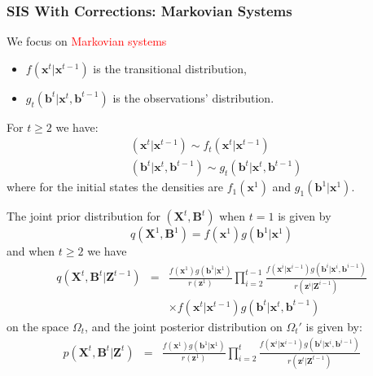 \documentclass[9pt, xcolor={dvipsnames,svgnames,table}]{beamer}
\begin{document}
\begin{frame}
    \frametitle{SIS With Corrections: Markovian Systems}
    We focus on \textcolor{Red}{Markovian systems}
    \begin{itemize}
        \item $f(\bm{x}^t | \bm{x}^{t-1})$ is the transitional distribution,
        \item  $g_t(\bm{b}^t | \bm{x}^t, \bm{b}^{t-1})$ is the observations' distribution.
    \end{itemize}
    For $t \geq 2$ we have:
    \begin{align*}
        &(\bm{x}^t | \bm{x}^{t-1}) \sim f_t(\bm{x}^t | \bm{x}^{t-1})\\
        &(\bm{b}^t | \bm{x}^t, \bm{b}^{t-1}) \sim g_t(\bm{b}^t | \bm{x}^t, \bm{b}^{t-1})
    \end{align*}
    where for the initial states the densities are $f_1(\bm{x}^1)$ and $g_1(\bm{b}^1 | \bm{x}^1)$.
    
    \textcolor{PineGreen}{The joint prior distribution} for $(\bm{X}^t,\bm{B}^t)$ when $t=1$ is given by 
    \begin{equation*}
    q(\bm{X}^1,\bm{B}^1) = f(\bm{x}^1)g(\bm{b}^1 | \bm{x}^1)
    \end{equation*}
    and when $t \geq 2$ we have
    \begin{eqnarray*}
        q(\bm{X}^t, \bm{B}^t | \bm{Z}^{t-1}) &=& \frac{f(\bm{x}^1)g(\bm{b}^1 | \bm{x}^1)}{r(\bm{z}^1)} \prod_{i=2}^{t-1} \frac{f(\bm{x}^i | \bm{x}^{i-1}) g(\bm{b}^i | \bm{x}^i, \bm{b}^{i-1})}{r(\bm{z}^i | \bm{Z}^{i-1})} \\
        & & \times f(\bm{x}^t | \bm{x}^{t-1}) g(\bm{b}^t | \bm{x}^t, \bm{b}^{t-1})
    \end{eqnarray*}
    on the space $\Omega_t$, and \textcolor{PineGreen}{the joint posterior distribution} on $\Omega_t'$ is given by:
    \begin{eqnarray*}
        p(\bm{X}^t, \bm{B}^t | \bm{Z}^t) 
        & = & \frac{f(\bm{x}^1)g(\bm{b}^1 | \bm{x}^1)}{r(\bm{z}^1)} \prod_{i=2}^t \frac{f(\bm{x}^i | \bm{x}^{i-1}) g(\bm{b}^i | \bm{x}^i , \bm{b}^{i-1})}{r(\bm{z}^t | \bm{Z}^{t-1})} 
    \end{eqnarray*}
\end{frame}
\end{document}

